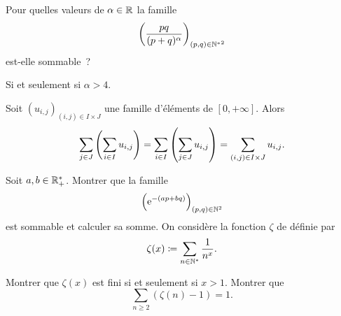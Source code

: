 \documentclass{magnolia}
\begin{document}
\begin{exoUnique}
\exo Pour quelles valeurs de $\alpha\in\mathbb{R}$ la famille
  \[\left(\frac{pq}{(p+q)^{\alpha}}\right)_{(p,q)\in{\mathbb{N}^*}^2}\]
  est-elle sommable~?
\begin{sol}
Si et seulement si $\alpha>4$. 
\end{sol}
\end{exoUnique}

\begin{proposition}[nom={Théorème de \nom{Fubini}}]
Soit $(u_{i,j})_{(i,j)\in I\times J}$ une famille d'éléments de $[0,+\infty]$. Alors
\[\sum_{j\in J} \left(\sum_{i\in I} u_{i,j}\right)=
  \sum_{i\in I} \left(\sum_{j\in J} u_{i,j}\right)=
  \sum_{(i,j)\in I\times J} u_{i,j}.\]
\end{proposition}


\begin{exos}
\exo Soit $a,b\in\mathbb{R}_+^*$. Montrer que la famille
  \[\left({\rm e}^{-(ap+bq)}\right)_{(p,q)\in\mathbb{N}^2}\]
  est sommable et calculer sa somme.
\exo On considère la fonction $\zeta$ de  définie par
  \[\zeta(x)\coloneqq\sum_{n\in{\mathbb{N}^*}} \frac{1}{n^x}.\]
  \begin{questions}
  \question Montrer que $\zeta(x)$ est fini si et seulement si $x>1$.
  \question Montrer que
    \[\sum_{n\geq 2} (\zeta(n)-1)=1.\] 
  \end{questions}
\end{exos}







\end{document}
